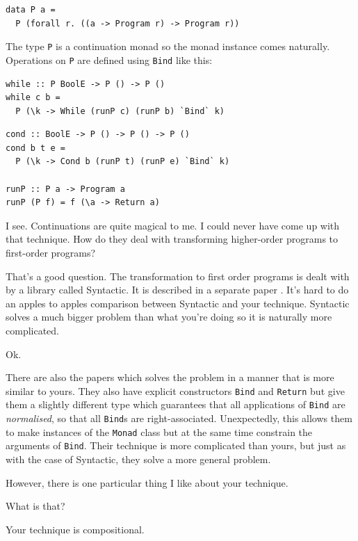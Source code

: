 \begin{small}
\begin{verbatim}
data P a =
  P (forall r. ((a -> Program r) -> Program r))
\end{verbatim}
\end{small}

\begin{dialogue}
\speak{\docname{}} The type \texttt{P} is a continuation monad so the
monad instance comes naturally. Operations on \texttt{P} are defined
using \texttt{Bind} like this:
\end{dialogue}

\begin{small}
\begin{verbatim}
while :: P BoolE -> P () -> P ()
while c b =
  P (\k -> While (runP c) (runP b) `Bind` k)
\end{verbatim}
\end{small}
\begin{small}
\begin{verbatim}
cond :: BoolE -> P () -> P () -> P ()
cond b t e =
  P (\k -> Cond b (runP t) (runP e) `Bind` k)

runP :: P a -> Program a
runP (P f) = f (\a -> Return a)
\end{verbatim}
\end{small}

\begin{dialogue}
\speak{\studname{}} I see. Continuations are quite magical to me. I
could never have come up with that technique. How do they deal with
transforming higher-order programs to first-order programs?

\speak{\docname{}} That's a good question. The transformation to first
order programs is dealt with by a library called Syntactic. It is
described in a separate paper . It's hard to do
an apples to apples comparison between Syntactic and your
technique. Syntactic solves a much bigger problem than what you're
doing so it is naturally more complicated.

\speak{\studname{}} Ok.

\speak{\docname{}} There are also the papers
 which solves
the problem in a manner that is more similar to yours. They also have explicit
constructors {\tt Bind} and {\tt Return} but give them a slightly different
type which guarantees that all applications of {\tt Bind} are {\em normalised},
so that all {\tt Bind}s are right-associated. Unexpectedly, this
allows them to make instances of the {\tt Monad} class but at the same time
constrain the arguments of {\tt Bind}.
Their technique is more complicated than yours, but just as with the
case of Syntactic, they solve a more general problem.

However, there is one particular thing I like about your technique.

\speak{\studname{}} What is that?

\speak{\docname{}} Your technique is compositional.

\end{dialogue}


